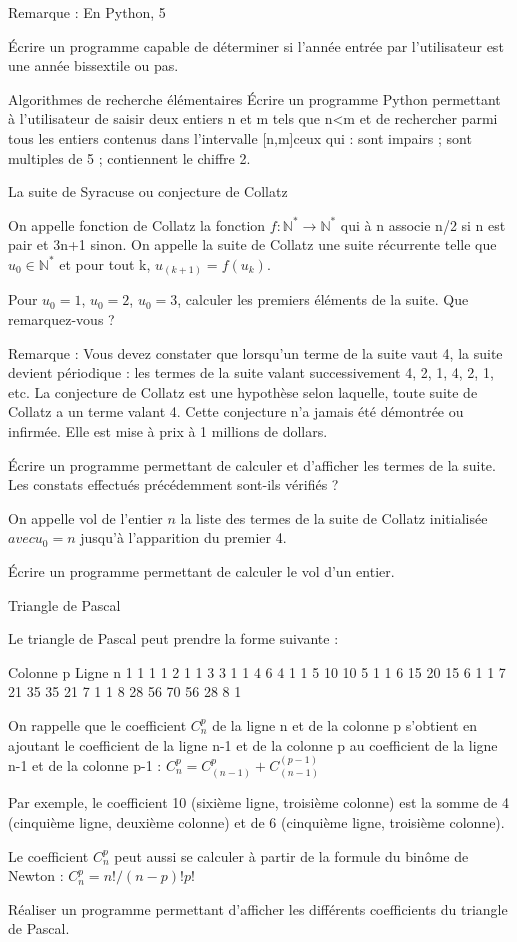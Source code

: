 \documentclass[10pt]{article}
\begin{document}
Remarque : 
En Python, 5%


	Écrire un programme capable de déterminer si l’année entrée par l’utilisateur est une année bissextile ou pas.

Algorithmes de recherche élémentaires
	Écrire un programme Python permettant à l’utilisateur de saisir deux entiers n et m tels que n<m et de rechercher parmi tous les entiers contenus dans l’intervalle [n,m]ceux qui : 
	sont impairs ;
	sont multiples de 5 ;
	contiennent le chiffre 2. 

La suite de Syracuse ou conjecture de Collatz

On appelle fonction de Collatz la fonction $f:\mathbb{N}^* \to  \mathbb{N}^*$ qui à n associe n/2 si n est pair et 3n+1 sinon.
On appelle la suite de Collatz une suite récurrente telle que $u_0\in \mathbb{N}^*$ et pour tout k, $u_(k+1)=f(u_k)$.

	Pour $u_0=1$, $u_0=2$, $u_0=3$, calculer les premiers éléments de la suite. Que remarquez-vous ?


Remarque :
	Vous devez constater que lorsqu’un terme de la suite vaut 4, la suite devient périodique : les termes de la suite valant successivement 4, 2, 1, 4, 2, 1, etc.
	La conjecture de Collatz est une hypothèse selon laquelle, toute suite de Collatz a un terme valant 4.
	Cette conjecture n’a jamais été démontrée ou infirmée. Elle est mise à prix à 1 millions de dollars.

Écrire un programme permettant de calculer et d’afficher les termes de la suite. Les constats effectués précédemment sont-ils vérifiés ?

On appelle vol de l’entier $n$ la liste des termes de la suite de Collatz initialisée $avec u_0=n$ jusqu’à l’apparition du premier 4. 

Écrire un programme permettant de calculer le vol d’un entier.














Triangle de Pascal


Le triangle de Pascal peut prendre la forme suivante :

	Colonne p
Ligne n	1								
	1	1							
	1	2	1						
	1	3	3	1					
	1	4	6	4	1				
	1	5	10	10	5	1			
	1	6	15	20	15	6	1		
	1	7	21	35	35	21	7	1	
	1	8	28	56	70	56	28	8	1

On rappelle que le coefficient $C_n^p$ de la ligne n et de la colonne p s’obtient en ajoutant le coefficient de la ligne n-1 et de la colonne p au coefficient de la ligne n-1 et de la colonne p-1 :
$C_n^p=C_(n-1)^p+C_(n-1)^(p-1)$

Par exemple, le coefficient 10 (sixième ligne, troisième colonne) est la somme de 4 (cinquième ligne, deuxième colonne) et de 6 (cinquième ligne, troisième colonne).

Le coefficient $C_n^p$ peut aussi se calculer à partir de la formule du binôme de Newton : 
$C_n^p=n!/(n-p)!p!$

	Réaliser un programme permettant d’afficher les différents coefficients du triangle de Pascal.
\end{document}
